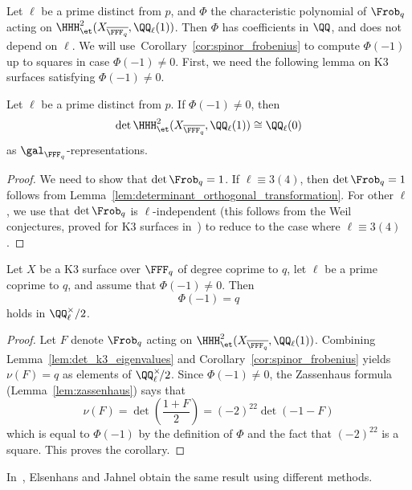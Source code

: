 Let $\ell$ be a prime distinct from $p$, and $\Phi$ the characteristic polynomial of $\Frob_q$ acting on $\HHH^2_{\et}(X_{\overline{\FFF_q}},\QQ_{\ell}(1))$. Then $\Phi$ has coefficients in $\QQ$, and does not depend on $\ell$. We will use~Corollary~\ref{cor:spinor_frobenius} to compute $\Phi(-1)$ up to squares in case $\Phi(-1) \neq 0$. First, we need the following lemma on K3 surfaces satisfying $\Phi(-1) \neq 0$.

\begin{lemma}\label{lem:det_k3_eigenvalues}
Let $\ell$ be a prime distinct from $p$. If $\Phi(-1) \neq 0$, then
$$
\det \HHH^2_{\et}(X_{\overline{\FFF_q}},\QQ_{\ell}(1)) \cong \QQ_{\ell}(0)
$$
as $\gal_{\FFF_q}$-representations.
\end{lemma}
\begin{proof}
We need to show that $\det \Frob_{q} = 1$. If $\ell \equiv 3 (4)$, then $\det \Frob_q = 1$ follows from Lemma~\ref{lem:determinant_orthogonal_transformation}. For other $\ell$, we use that $\det \Frob_q$ is $\ell$-independent (this follows from the Weil conjectures, proved for K3 surfaces in~\cite{DeligneK3}) to reduce to the case where $\ell \equiv 3 (4)$.
\end{proof}

\begin{corollary}\label{cor:zeta_fn_k3}
    Let $X$ be a K3 surface over $\FFF_q$ of degree coprime to $q$, let $\ell$ be a prime coprime to $q$, and assume that $\Phi(-1) \neq 0$. Then 
$$
    \Phi(-1) = q
$$
    holds in $\QQ_{\ell}^{\times}/2$.
\end{corollary}
\begin{proof}
Let $F$ denote $\Frob_q$ acting on $\HHH^2_{\et}(X_{\overline{\FFF_q}},\QQ_{\ell}(1))$. Combining Lemma~\ref{lem:det_k3_eigenvalues} and Corollary~\ref{cor:spinor_frobenius} yields $\nu(F) = q$ as elements of $\QQ_{\ell}^{\times}\!/2$. Since $\Phi(-1) \neq 0$, the Zassenhaus formula (Lemma~\ref{lem:zassenhaus}) says that
$$
    \nu(F) = \det\left(\frac{1 + F}{2}\right) = (-2)^{22} \det(-1-F)
$$
    which is equal to $\Phi(-1)$ by the definition of $\Phi$ and the fact that $(-2)^{22}$ is a square. This proves the corollary.
\end{proof}

\begin{remark}
    In~\cite[Proposition~3.11]{ElsenhansJahnel}, Elsenhans and Jahnel obtain the same result using different methods.
\end{remark}


